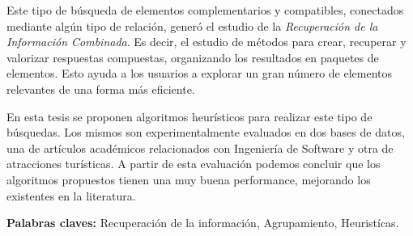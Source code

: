Este tipo de búsqueda de elementos complementarios y compatibles, conectados mediante algún tipo de relación, generó el estudio de la {\em Recuperación de la Información Combinada}. Es decir, el estudio de métodos para crear, recuperar y valorizar respuestas compuestas, organizando los resultados en paquetes de elementos. Esto ayuda a los usuarios a explorar un gran número de elementos relevantes de una forma más eficiente.

En esta tesis se proponen algoritmos heurísticos para realizar este tipo de búsquedas. Los mismos son experimentalmente evaluados en dos bases de datos, una de artículos académicos relacionados con Ingeniería de Software y otra de atracciones turísticas. A partir de esta evaluación podemos concluir que los algoritmos propuestos tienen una muy buena performance, mejorando los existentes en la literatura.
\bigskip

\noindent\textbf{Palabras claves:} Recuperación de la información, Agrupamiento, Heuristícas.